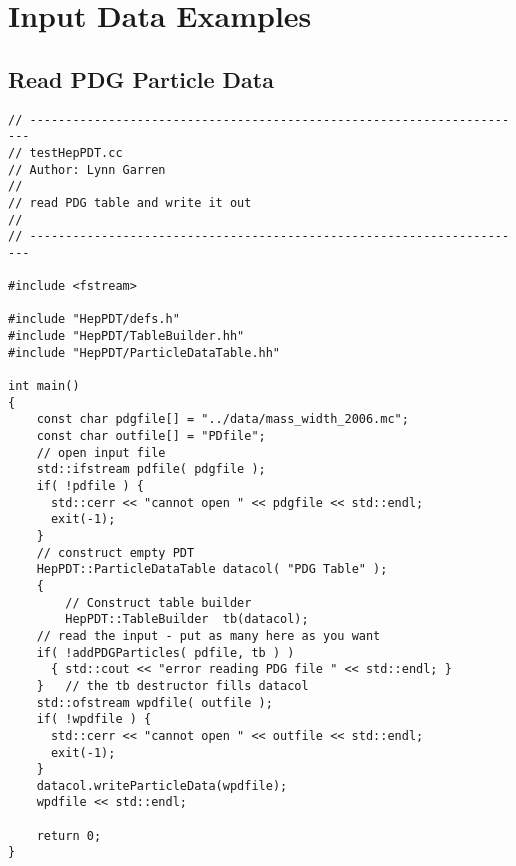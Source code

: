 \section { Input Data Examples}
\label{readdata}

\subsection { Read PDG Particle Data }
\begin{verbatim}
// ----------------------------------------------------------------------
// testHepPDT.cc
// Author: Lynn Garren
//
// read PDG table and write it out
//
// ----------------------------------------------------------------------

#include <fstream>

#include "HepPDT/defs.h"
#include "HepPDT/TableBuilder.hh"
#include "HepPDT/ParticleDataTable.hh"

int main()
{
    const char pdgfile[] = "../data/mass_width_2006.mc";
    const char outfile[] = "PDfile";
    // open input file
    std::ifstream pdfile( pdgfile );
    if( !pdfile ) { 
      std::cerr << "cannot open " << pdgfile << std::endl;
      exit(-1);
    }
    // construct empty PDT
    HepPDT::ParticleDataTable datacol( "PDG Table" );
    {
        // Construct table builder
        HepPDT::TableBuilder  tb(datacol);
	// read the input - put as many here as you want
	if( !addPDGParticles( pdfile, tb ) ) 
	  { std::cout << "error reading PDG file " << std::endl; }
    }	// the tb destructor fills datacol
    std::ofstream wpdfile( outfile );
    if( !wpdfile ) { 
      std::cerr << "cannot open " << outfile << std::endl;
      exit(-1);
    }
    datacol.writeParticleData(wpdfile);
    wpdfile << std::endl;
    
    return 0;
}
\end{verbatim}

